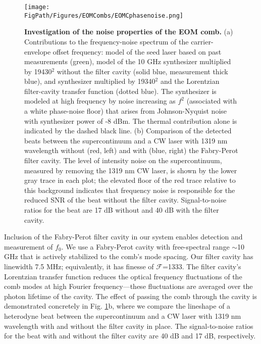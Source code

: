 \begin{figure}[htpb]
	\begin{center}
		\texttt{[image: \\FigPath/Figures/EOMCombs/EOMCphasenoise.png]}
	\end{center}
	\caption[Investigation of the noise properties of the EOM comb]{\textbf{Investigation of the noise properties of the EOM comb.}  (a) Contributions to the frequency-noise spectrum of the carrier-envelope offset frequency: model of the seed laser based on past measurements (green), model of the 10 GHz synthesizer multiplied by 19430$^2$ without the filter cavity (solid blue, measurement thick blue), and synthesizer multiplied by 19340$^2$ and the Lorentzian filter-cavity transfer function (dotted blue). The synthesizer is modeled at high frequency by noise increasing as $f^2$ (associated with a white phase-noise floor) that arises from Johnson-Nyquist noise with synthesizer power of -8 dBm. The thermal contribution alone is indicated by the dashed black line. (b) Comparison of the detected beats between the supercontinuum and a CW laser with 1319 nm wavelength without (red, left) and with (blue, right) the Fabry-Perot filter cavity. The level of intensity noise on the supercontinuum, measured by removing the 1319 nm CW laser, is shown by the lower gray trace in each plot; the elevated floor of the red trace relative to this background indicates that frequency noise is responsible for the reduced SNR of the beat without the filter cavity. Signal-to-noise ratios for the beat are 17 dB without and 40 dB with the filter cavity.}
	\label{fig:EOMC_noise}
\end{figure} 

Inclusion of the Fabry-Perot filter cavity in our system enables detection and measurement of $f_0$. We use a Fabry-Perot cavity with free-spectral range $\sim$10 GHz that is actively stabilized to the comb's mode spacing. Our filter cavity has linewidth 7.5 MHz; equivalently, it has finesse of $\mathcal{F}$=1333. The filter cavity's Lorentzian transfer function reduces the optical frequency fluctuations of the comb modes at high Fourier frequency---these fluctuations are averaged over the photon lifetime of the cavity. The effect of passing the comb through the cavity is demonstrated concretely in Fig. \ref{fig:EOMC_noise}b, where we compare the lineshape of a heterodyne beat between the supercontinuum and a CW laser with 1319 nm wavelength with and without the filter cavity in place. The signal-to-noise ratios for the beat with and without the filter cavity are 40 dB and 17 dB, respectively.





